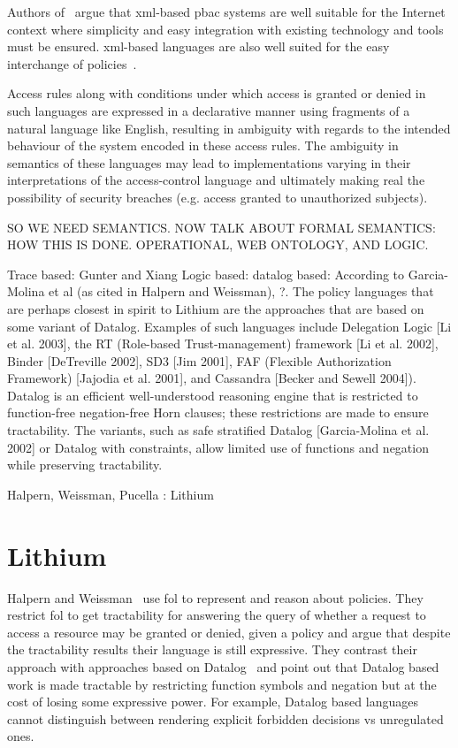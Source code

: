 Authors of~\cite{ArdagnaDVS04} argue that \ac{xml}-based \ac{pbac} systems are well suitable for the Internet context where simplicity and easy integration with existing technology and tools must be ensured. \ac{xml}-based languages are also well suited for the easy interchange of policies~\cite{ArdagnaDVS04}. 

Access rules along with conditions under which access is granted or denied in such languages are expressed in a declarative manner using fragments of a natural language like English, resulting in ambiguity with regards to the intended behaviour of the system encoded in these access rules. The ambiguity in semantics of these languages may lead to implementations varying in their interpretations of the access-control language and ultimately making real the possibility of security breaches (e.g. access granted to unauthorized subjects). 

SO WE NEED SEMANTICS. NOW TALK ABOUT FORMAL SEMANTICS: HOW THIS IS DONE. OPERATIONAL, WEB ONTOLOGY, AND LOGIC.

Trace based: Gunter and Xiang
Logic based:
  datalog based: According to Garcia-Molina et al (as cited in Halpern and Weissman),  ?. 
  The policy languages that are perhaps closest in spirit to Lithium are the approaches that are based on some variant of Datalog. Examples of such languages include Delegation Logic [Li et al. 2003], the RT (Role-based Trust-management) framework [Li et al. 2002], Binder [DeTreville 2002], SD3 [Jim 2001], FAF (Flexible Authorization Framework) [Jajodia et al. 2001], and Cassandra [Becker and Sewell 2004]). Datalog is an efficient well-understood reasoning engine that is restricted to function-free negation-free Horn clauses; these restrictions are made to ensure tractability. The variants, such as safe stratified Datalog [Garcia-Molina et al. 2002] or Datalog with constraints, allow limited use of functions and negation while preserving tractability.
  
 Halpern, Weissman, Pucella : Lithium
 
 \section{Lithium}
Halpern and Weissman~\cite{Halpern2008} use \ac{fol} to represent and reason about policies. They restrict \ac{fol} to get tractability for answering the query of whether a request to access a resource may be granted or denied, given a policy and argue that despite the tractability results their language is still expressive. They contrast their approach with approaches based on Datalog~\cite{datalog} and point out that Datalog based work is made tractable by restricting function symbols and negation but at the cost of losing some expressive power. For example, Datalog based languages cannot distinguish between rendering explicit forbidden decisions vs unregulated ones.

